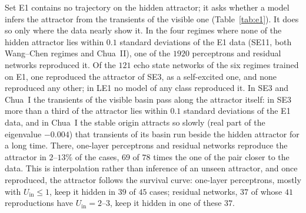\documentclass[aip,cha,reprint,amsmath,amssymb,longbibliography]{revtex4-2}
\theoremstyle{definition}
\newcommand{\Uin}{U_{\mathrm{in}}}
\begin{document}
Set E1 contains no trajectory on the hidden attractor; it asks whether a model infers the attractor from the transients of
the visible one (Table~\ref{tab:e1}). It does so only where the data nearly show it. In the four regimes where none of
the hidden attractor lies within $0.1$ standard deviations of the E1 data (SE11, both Wang--Chen regimes and Chua~II), one
of the $1920$ perceptrons and residual networks reproduced it. Of the $121$ echo state networks of the six regimes trained
on E1, one reproduced the attractor of SE3, as a self-excited one, and none reproduced any other; in LE1 no model of any
class reproduced it. In SE3 and Chua~I the transients of the visible basin pass along the
attractor itself: in SE3 more than a third of the attractor lies within $0.1$ standard deviations of the E1 data, and in
Chua~I the stable origin attracts so slowly (real part of the eigenvalue $-0.004$) that transients of its basin run beside
the hidden attractor for a long time. There, one-layer perceptrons and residual networks reproduce the attractor in
$2$--$13\%$ of the cases, $69$ of $78$ times the one of the pair closer to the data. This is interpolation rather than
inference of an unseen attractor, and once reproduced, the attractor follows the survival curve: one-layer perceptrons,
mostly with $\Uin\le1$, keep it hidden in $39$ of $45$ cases; residual networks, $37$ of whose $41$ reproductions have
$\Uin=2$--$3$, keep it hidden in one of these $37$.
\end{document}

